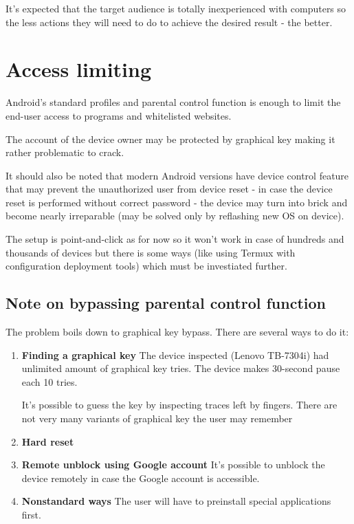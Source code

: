 \documentclass[a4paper]{report}
\begin{document}
It's expected that the target audience is totally inexperienced with
computers so the less actions they will need to do to achieve the
desired result - the better.


\section{Access limiting}

Android's standard profiles and parental control function is enough to
limit the end-user access to programs and whitelisted websites.

The account of the device owner may be protected by graphical key
making it rather problematic to crack.

It should also be noted that modern Android versions have device control
feature that may prevent the unauthorized user from device reset -
in case the device reset is performed without correct password - the
device may turn into brick and become nearly irreparable (may be
solved only by reflashing new OS on device).

The setup is point-and-click as for now so it won't work in case of
hundreds and thousands of devices but there is some ways (like using
Termux with configuration deployment tools) which must be investiated
further.


\subsection{Note on bypassing parental control function}

The problem boils down to graphical key bypass. There are
several ways to do it:

\begin{enumerate}
\item \textbf{Finding a graphical key}
The device inspected (Lenovo TB-7304i) had unlimited amount of
graphical key tries. The device makes 30-second pause each 10 tries.

It's possible to guess the key by inspecting traces left by fingers.
There are not very many variants of graphical key the user may remember
\item \textbf{Hard reset}
\item \textbf{Remote unblock using Google account}
It's possible to unblock the device remotely in case the Google account
is accessible.
\item \textbf{Nonstandard ways}
The user will have to preinstall special applications first.
\end{enumerate}
\end{document}
